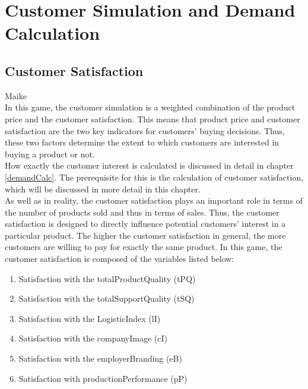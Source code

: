 \section{Customer Simulation and Demand Calculation}
\label{sec:customsim}
\subsection{Customer Satisfaction}
Maike\\
In this game, the customer simulation is a weighted combination of the product price and the customer satisfaction.
This means that product price and customer satisfaction are the two key indicators for customers' buying decisions. Thus, these two factors determine the extent to which customers are interested in buying a product or not.\\
How exactly the customer interest is calculated is discussed in detail in chapter \ref{demandCalc}. The prerequisite for this is the calculation of customer satisfaction, which will be discussed in more detail in this chapter.\\
As well as in reality, the customer satisfaction plays an important role in terms of the number of products sold and thus in terms of sales. \cite[p.~6f]{deptolla_effects_2004}
Thus, the customer satisfaction is designed to directly influence potential customers' interest in a particular product. The higher the customer satisfaction in general, the more customers are willing to pay for exactly the same product. 
In this game, the customer satisfaction is composed of the variables listed below:
\begin{enumerate}
      \item Satisfaction with the totalProductQuality (tPQ)
      \item Satisfaction with the totalSupportQuality (tSQ)
      \item Satisfaction with the LogisticIndex (lI)
      \item Satisfaction with the companyImage (cI)
      \item Satisfaction with the employerBranding (eB)
      \item Satisfaction with productionPerformance (pP)
\end{enumerate}

